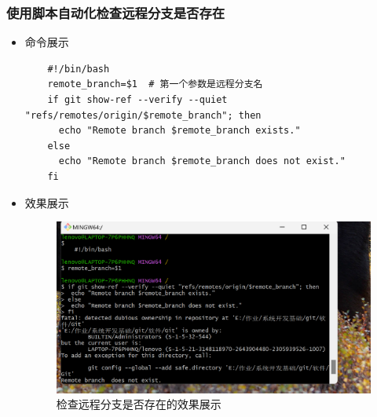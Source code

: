 \documentclass[UTF8]{ctexart}
\begin{document}
\subsubsection{使用脚本自动化检查远程分支是否存在}
\begin{itemize}
  \item 命令展示
  \begin{verbatim}
    #!/bin/bash
    remote_branch=$1  # 第一个参数是远程分支名
    if git show-ref --verify --quiet "refs/remotes/origin/$remote_branch"; then
      echo "Remote branch $remote_branch exists."
    else
      echo "Remote branch $remote_branch does not exist."
    fi
  \end{verbatim}

  \item 效果展示
  \begin{figure}[H]
    \centering
    \includegraphics[width=\textwidth]{25} %
    \caption{检查远程分支是否存在的效果展示}
    \label{fig:remote-branch-check}
  \end{figure}
\end{itemize}


\end{document}
